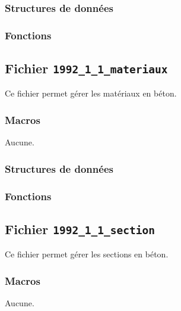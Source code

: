 \documentclass{article}
\begin{document}
\subsubsection{Structures de données}

\subsubsection{Fonctions}












\subsection{Fichier {\texttt{1992\_1\_1\_materiaux}}}
Ce fichier permet gérer les matériaux en béton.
\subsubsection{Macros}
Aucune.
\subsubsection{Structures de données}

\subsubsection{Fonctions}








\subsection{Fichier {\texttt{1992\_1\_1\_section}}}
Ce fichier permet gérer les sections en béton.
\subsubsection{Macros}
Aucune.
\end{document}
